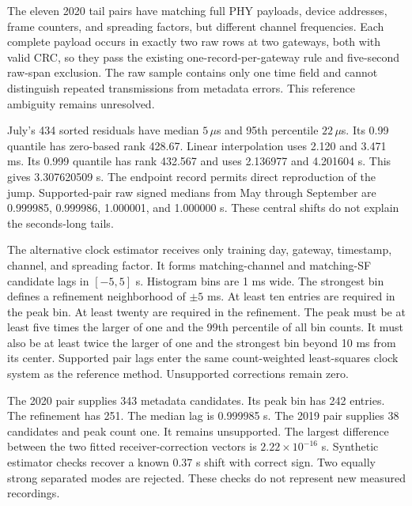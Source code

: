\begin{table}[!htb]\caption{Corrected reference-pair time differences. Tail means an absolute difference above 10 ms. The last column counts tails with different reported channels. The 2019 receiver pair has no supported clock correction. Every central 2020 pair has matching channels. All records remain in the evaluation.}\label{tab:deep_loed_tail}
\scriptsize\setlength{\tabcolsep}{3pt}\end{table}

The eleven 2020 tail pairs have matching full PHY payloads, device addresses, frame counters, and spreading factors, but different channel frequencies. Each complete payload occurs in exactly two raw rows at two gateways, both with valid CRC, so they pass the existing one-record-per-gateway rule and five-second raw-span exclusion. The raw sample contains only one time field and cannot distinguish repeated transmissions from metadata errors. This reference ambiguity remains unresolved.

July's 434 sorted residuals have median $5\,\mu$s and 95th percentile $22\,\mu$s. Its 0.99 quantile has zero-based rank 428.67. Linear interpolation uses 2.120 and 3.471 ms. Its 0.999 quantile has rank 432.567 and uses 2.136977 and 4.201604 s. This gives 3.307620509 s. The endpoint record permits direct reproduction of the jump. Supported-pair raw signed medians from May through September are 0.999985, 0.999986, 1.000001, and 1.000000 s. These central shifts do not explain the seconds-long tails.

The alternative clock estimator receives only training day, gateway, timestamp, channel, and spreading factor. It forms matching-channel and matching-SF candidate lags in $[-5,5]$ s. Histogram bins are 1 ms wide. The strongest bin defines a refinement neighborhood of $\pm5$ ms. At least ten entries are required in the peak bin. At least twenty are required in the refinement. The peak must be at least five times the larger of one and the 99th percentile of all bin counts. It must also be at least twice the larger of one and the strongest bin beyond 10 ms from its center. Supported pair lags enter the same count-weighted least-squares clock system as the reference method. Unsupported corrections remain zero.

The 2020 pair supplies 343 metadata candidates. Its peak bin has 242 entries. The refinement has 251. The median lag is 0.999985 s. The 2019 pair supplies 38 candidates and peak count one. It remains unsupported. The largest difference between the two fitted receiver-correction vectors is $2.22\times10^{-16}$ s. Synthetic estimator checks recover a known 0.37 s shift with correct sign. Two equally strong separated modes are rejected. These checks do not represent new measured recordings.


